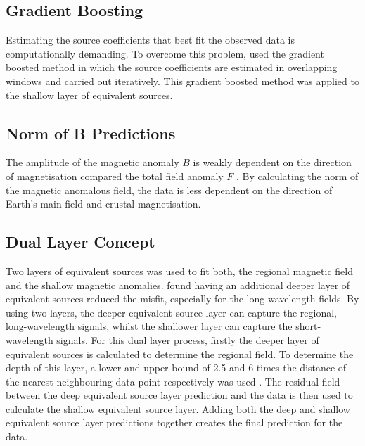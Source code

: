 \subsection{Gradient Boosting}
Estimating the source coefficients that best fit the observed data is computationally demanding. To overcome this problem, \cite{SolerUieda2021} used the gradient boosted method in which the source coefficients are estimated in overlapping windows and carried out iteratively. This gradient boosted method was applied to the shallow layer of equivalent sources.

\subsection{Norm of B Predictions}
The amplitude of the magnetic anomaly $B$ is weakly dependent on the direction of magnetisation compared the total field anomaly $F$ \cite{HidalgoGato2021}. By calculating the norm of the magnetic anomalous field, the data is less dependent on the direction of Earth’s main field and crustal magnetisation.

\subsection{Dual Layer Concept}
Two layers of equivalent sources was used to fit both, the regional magnetic field and the shallow magnetic anomalies. \cite{Li2019} found having an additional deeper layer of equivalent sources reduced the misfit, especially for the long‐wavelength fields. By using two layers, the deeper equivalent source layer can capture the regional, long-wavelength signals, whilst the shallower layer can capture the short-wavelength signals. For this dual layer process, firstly the deeper layer of equivalent sources is calculated to determine the regional field. To determine the depth of this layer, a lower and upper bound of 2.5 and 6 times the distance of the nearest neighbouring data point respectively was used \cite{Dampney1969}. The residual field between the deep equivalent source layer prediction and the data is then used to calculate the shallow equivalent source layer. Adding both the deep and shallow equivalent source layer predictions together creates the final prediction for the data.

